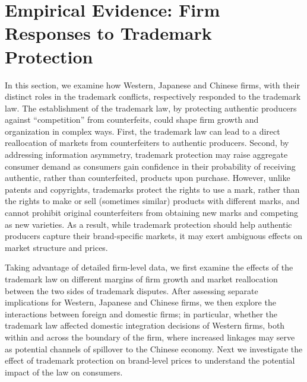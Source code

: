 \documentclass[12pt]{article}
\begin{document}
\section{Empirical Evidence: Firm Responses to Trademark Protection} \label{sec:empirical_evidence}

In this section, we examine how Western, Japanese and Chinese firms, with their distinct roles in the trademark conflicts, respectively responded to the trademark law. The establishment of the trademark law, by protecting authentic producers against ``competition'' from counterfeits, could shape firm growth and organization in complex ways. First, the trademark law can lead to a direct reallocation of markets from counterfeiters to authentic producers. Second, by addressing information asymmetry, trademark protection may raise aggregate consumer demand as consumers gain confidence in their probability of receiving authentic, rather than counterfeited, products upon purchase. However, unlike patents and copyrights, trademarks protect the rights to use a mark, rather than the rights to make or sell (sometimes similar) products with different marks, and cannot prohibit original counterfeiters from obtaining new marks and competing as new varieties. As a result, while trademark protection should help authentic producers capture their brand-specific markets, it may exert ambiguous effects on market structure and prices.

Taking advantage of detailed firm-level data, we first examine the effects of the trademark law on different margins of firm growth and market reallocation between the two sides of trademark disputes. After assessing separate implications for Western, Japanese and Chinese firms, we then explore the interactions between foreign and domestic firms; in particular, whether the trademark law affected domestic integration decisions of Western firms, both within and across the boundary of the firm, where increased linkages may serve as potential channels of spillover to the Chinese economy. Next we investigate the effect of trademark protection on brand-level prices to understand the potential impact of the law on consumers.  %


\end{document}
